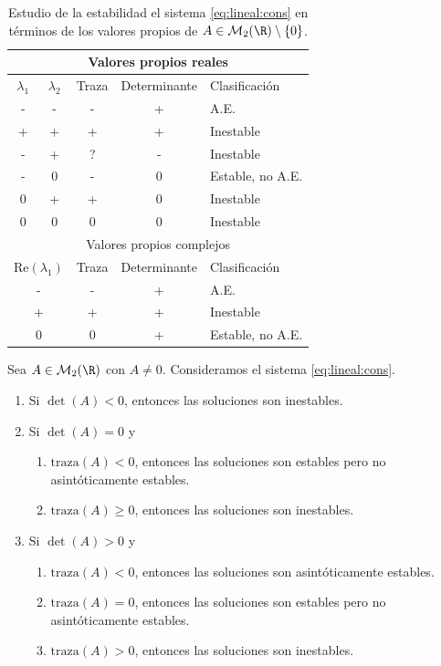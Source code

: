 \begin{table}[H]
  \centering
  \begin{tabular}{|cc|cc|l|}
    \hline
    \multicolumn{5}{|c|}{Valores propios reales} \\
    \hline
    $\lambda_1$ & $\lambda_2$ & Traza & Determinante & Clasificación \\
    \hline
    - & - & - & + & A.E. \\
    + & + & + & + & Inestable \\
    - & + & ? & - & Inestable \\
    - & 0 & - & 0 & Estable, no A.E. \\
    0 & + & + & 0 & Inestable \\
    0 & 0 & 0 & 0 & Inestable \\
    \hline
    \multicolumn{5}{|c|}{Valores propios complejos} \\
    \hline
    \multicolumn{2}{|c}{$\mathrm{Re}(\lambda_1)$} & Traza & Determinante & Clasificación \\
    \hline
    \multicolumn{2}{|c}{-} & - & + & A.E. \\
    \multicolumn{2}{|c}{+} & + & + & Inestable \\
    \multicolumn{2}{|c}{0} & 0 & + & Estable, no A.E.\\
    \hline
  \end{tabular}
  \caption{Estudio de la estabilidad el sistema \eqref{eq:lineal:cons} en términos de los valores
    propios de $A \in \mathcal{M}_2(\R) \setminus \{0\}$.}
  \label{table:estabilidad}
\end{table}

\begin{corollary}
  Sea $A \in \mathcal{M}_2(\R)$ con $A \ne 0$. Consideramos el sistema \eqref{eq:lineal:cons}.
  \begin{enumerate}
  \item Si $\det(A) < 0$, entonces las soluciones son inestables.
  \item Si $\det(A) = 0$ y
    \begin{enumerate}[label=\arabic*.]
    \item $\mathrm{traza}(A) < 0$, entonces las soluciones son estables pero no asintóticamente
      estables.
    \item $\mathrm{traza}(A) \ge 0$, entonces las soluciones son inestables.
    \end{enumerate}
  \item Si $\det(A) > 0$ y
    \begin{enumerate}[label=\arabic*.]
    \item $\mathrm{traza}(A) < 0$, entonces las soluciones son asintóticamente estables.
    \item $\mathrm{traza}(A) = 0$, entonces las soluciones son estables pero no asintóticamente
      estables.
    \item $\mathrm{traza}(A) > 0$, entonces las soluciones son inestables.
    \end{enumerate}
  \end{enumerate}
\end{corollary}

